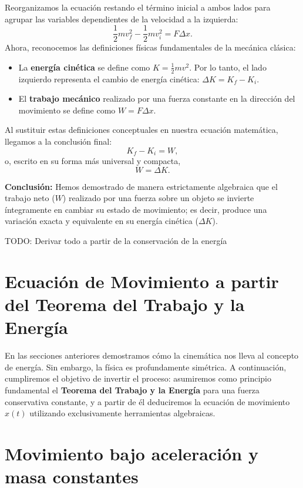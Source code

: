 \documentclass[11pt,a4paper]{book}
\begin{document}
Reorganizamos la ecuación restando el término inicial a ambos lados para agrupar las variables dependientes de la velocidad a la izquierda:
\begin{equation}
    \frac{1}{2}m v_f^2 - \frac{1}{2}m v_i^2 = F \Delta x.
\end{equation}
Ahora, reconocemos las definiciones físicas fundamentales de la mecánica clásica:
\begin{itemize}
    \item La \textbf{energía cinética} se define como $K = \frac{1}{2}mv^2$. Por lo tanto, el lado izquierdo representa el cambio de energía cinética: $\Delta K = K_f - K_i$.
    \item El \textbf{trabajo mecánico} realizado por una fuerza constante en la dirección del movimiento se define como $W = F \Delta x$.
\end{itemize}
Al sustituir estas definiciones conceptuales en nuestra ecuación matemática, llegamos a la conclusión final:
\begin{equation}
    K_f - K_i = W,
\end{equation}
o, escrito en su forma más universal y compacta,
\begin{equation}
    W = \Delta K.
\end{equation}

\textbf{Conclusión:} 
Hemos demostrado de manera estrictamente algebraica que el trabajo neto ($W$) realizado por una fuerza sobre un objeto se invierte íntegramente en cambiar su estado de movimiento; es decir, produce una variación exacta y equivalente en su energía cinética ($\Delta K$).


TODO: Derivar todo a partir de la conservación de la energía

\section{Ecuación de Movimiento a partir del Teorema del Trabajo y la Energía}

En las secciones anteriores demostramos cómo la cinemática nos lleva al concepto de energía. Sin embargo, la física es profundamente simétrica. A continuación, cumpliremos el objetivo de invertir el proceso: asumiremos como principio fundamental el \textbf{Teorema del Trabajo y la Energía} para una fuerza conservativa constante, y a partir de él deduciremos la ecuación de movimiento $x(t)$ utilizando exclusivamente herramientas algebraicas.

\section{Movimiento bajo aceleración y masa constantes}
\end{document}
